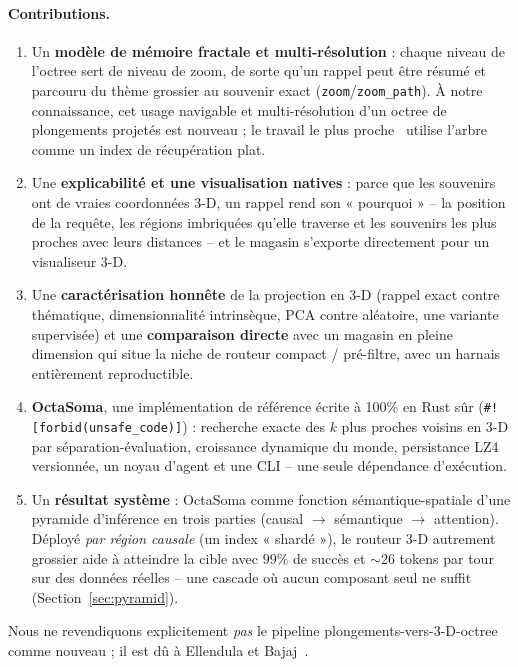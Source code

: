 \documentclass[11pt]{article}
\begin{document}
\paragraph{Contributions.}
\begin{enumerate}
  \item Un \textbf{modèle de mémoire fractale et multi-résolution} : chaque niveau de
  l'octree sert de niveau de zoom, de sorte qu'un rappel peut être résumé et parcouru
  du thème grossier au souvenir exact (\texttt{zoom}/\texttt{zoom\_path}). À notre
  connaissance, cet usage navigable et multi-résolution d'un octree de plongements
  projetés est nouveau ; le travail le plus proche~\cite{octreerag} utilise l'arbre
  comme un index de récupération plat.
  \item Une \textbf{explicabilité et une visualisation natives} : parce que les
  souvenirs ont de vraies coordonnées 3-D, un rappel rend son « pourquoi » -- la
  position de la requête, les régions imbriquées qu'elle traverse et les souvenirs
  les plus proches avec leurs distances -- et le magasin s'exporte directement pour un
  visualiseur 3-D.
  \item Une \textbf{caractérisation honnête} de la projection en 3-D (rappel exact
  contre thématique, dimensionnalité intrinsèque, PCA contre aléatoire, une variante
  supervisée) et une \textbf{comparaison directe} avec un magasin en pleine dimension
  qui situe la niche de routeur compact / pré-filtre, avec un harnais entièrement
  reproductible.
  \item \textbf{OctaSoma}, une implémentation de référence écrite à 100\% en Rust sûr
  (\texttt{\#![forbid(unsafe\_code)]}) : recherche exacte des $k$ plus proches voisins
  en 3-D par séparation-évaluation, croissance dynamique du monde, persistance LZ4
  versionnée, un noyau d'agent et une CLI -- une seule dépendance d'exécution.
  \item Un \textbf{résultat système} : OctaSoma comme fonction sémantique-spatiale
  d'une pyramide d'inférence en trois parties (causal $\rightarrow$ sémantique
  $\rightarrow$ attention). Déployé \emph{par région causale} (un index « shardé »),
  le routeur 3-D autrement grossier aide à atteindre la cible avec $99\%$ de succès
  et ${\sim}26$ tokens par tour sur des données réelles -- une cascade où aucun
  composant seul ne suffit (Section~\ref{sec:pyramid}).
\end{enumerate}
Nous ne revendiquons explicitement \emph{pas} le pipeline plongements-vers-3-D-octree
comme nouveau ; il est dû à Ellendula et Bajaj~\cite{octreerag}.
\end{document}
